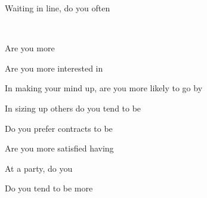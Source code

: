 \documentclass[english,pdf,pagemark,stamp,globalid=\candidateID,oneside,PrintQuestionnaireId=False]{sdaps}
\begin{document}
\begin{questionnaire}
\begin{multicols}{2}
\begin{choicequestion}[2]{Waiting in line, do you often}
\end{choicequestion}
\\
\begin{choicequestion}[2]{Are you more}
\end{choicequestion}

\begin{choicequestion}[2]{Are you more interested in}
\end{choicequestion}

\begin{choicequestion}[2]{In making your mind up, are you more likely to go by}
\end{choicequestion}

\begin{choicequestion}[2]{In sizing up others do you tend to be}
\end{choicequestion}

\begin{choicequestion}[2]{Do you prefer contracts to be}
\end{choicequestion}

\begin{choicequestion}[2]{Are you more satisfied having}
\end{choicequestion}

\begin{choicequestion}[2]{At a party, do you}
\end{choicequestion}

\begin{choicequestion}[2]{Do you tend to be more}
\end{choicequestion}


\end{multicols}
\end{questionnaire}
\end{document}
